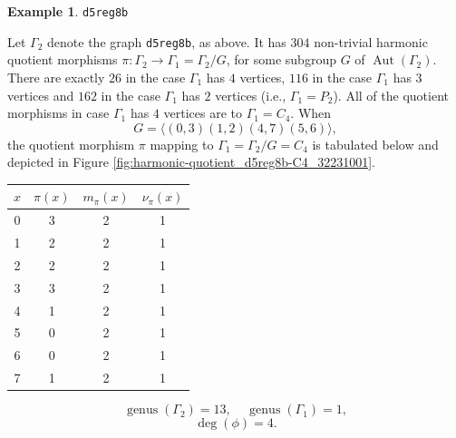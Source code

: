 \documentclass[12pt,letterpaper]{article}
\theoremstyle{definition}
\newtheorem{example}[theorem]{Example}
\DeclareMathOperator{\Aut}{Aut}
\DeclareMathOperator{\genus}{genus}
\begin{document}
\begin{example}%
  \label{example:d5reg8b}
  {\tt d5reg8b}\newline
{\rm  
  Let $\Gamma_2$ denote the graph {\tt d5reg8b}, as above.
It has $304$  non-trivial harmonic quotient morphisms
$\pi: \Gamma_2\to \Gamma_1=\Gamma_2/G$,
for some subgroup $G$ of $\Aut(\Gamma_2)$.
There are exactly $26$ in the case $\Gamma_1$ has $4$ vertices,
$116$ in the case $\Gamma_1$ has $3$ vertices
and $162$ in the case $\Gamma_1$ has $2$ vertices
(i.e., $\Gamma_1=P_2$).
All of the quotient morphisms in case $\Gamma_1$ has $4$ vertices
are to $\Gamma_1=C_4$. 
  When
\[
G = \langle (0,3)(1,2)(4,7)(5,6) \rangle ,
\]
the quotient morphism $\pi$ mapping to
$\Gamma_1=\Gamma_2/G =C_4$
is tabulated below
and  depicted in Figure \ref{fig:harmonic-quotient_d5reg8b-C4_32231001}.

\begin{center}
\begin{tabular}{c|c|c|c}  
  $x$ & $\pi(x)$ & $m_\pi(x)$ & $\nu_\pi(x)$   \\ \hline
  0   &    3   &        2         &  1  \\ 
  1   &    2   &        2         &  1  \\ 
  2   &    2   &        2         &  1  \\ 
  3   &    3   &        2         &  1   \\
  4   &    1   &        2         &  1   \\
  5   &    0   &        2         &  1   \\
  6   &    0   &        2         &  1   \\
  7   &    1   &        2         &  1   \\
\end{tabular}
\end{center}

\[
  \genus(\Gamma_2) =13,\ \ \ \ \
  \genus(\Gamma_1) =1,
\]
\[
\deg(\phi) =4.
\]

}
\end{example}
\end{document}
